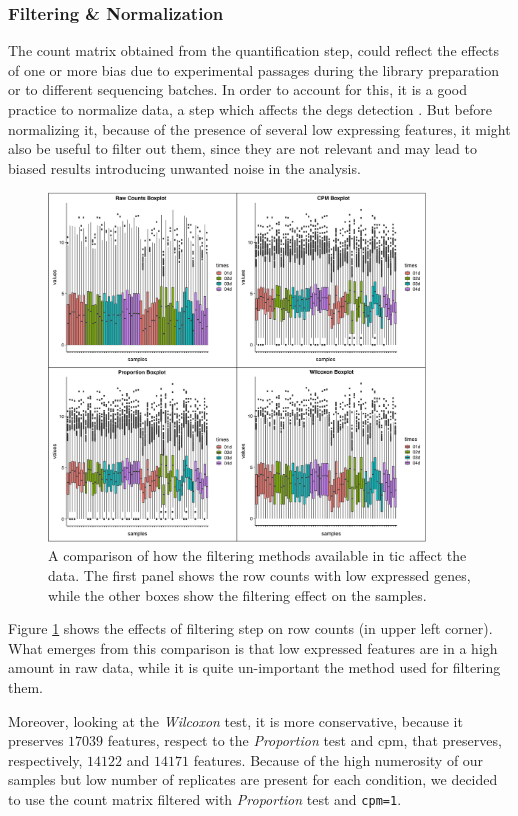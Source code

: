 \subsubsection{Filtering \& Normalization}
The count matrix obtained from the quantification step, could reflect the effects of one or more bias due to experimental passages during the library preparation or to different sequencing batches.
In order to account for this, it is a good practice to normalize data, a step which affects the \glspl{deg} detection \cite{Peixoto2015, Soneson2013d, Bullard2010}.
But before normalizing it, because of the presence of several low expressing features, it might also be useful to filter out them, since they are not relevant and may lead to biased results introducing unwanted noise in the analysis. 

\begin{figure}[H]
\centering
\includegraphics[width=10cm, keepaspectratio]{img/ticorser/filtering/panel1.pdf}
\caption[ticorser filtering methods]{A comparison of how the filtering methods available in \gls{tic} affect the data.
The first panel shows the row counts with low expressed genes, while the other boxes show the filtering effect on the samples.}
\label{fig:ticorserfiltering}
\end{figure}

Figure \ref{fig:ticorserfiltering} shows the effects of filtering step on row counts (in upper left corner). 
What emerges from this comparison is that low expressed features are in a high amount in raw data, while it is quite un-important the method used for filtering them.


Moreover, looking at the \textit{Wilcoxon} test, it is more conservative, because it preserves $17039$ features, respect to the \textit{Proportion} test and \gls{cpm}, that preserves, respectively, $14122$ and $14171$ features.
Because of the high numerosity of our samples but low number of replicates are present for each condition, we decided to use the count matrix filtered with \textit{Proportion} test and \lstinline!cpm=1!.


